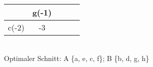 \documentclass[a4paper]{article}
\begin{document}
	\begin{minipage}[t]{.48\textwidth}
		\begin{center}
			\begin{tabular}{c|cccc}
							&	g(-1)	\\\hline
					c(-2)	&	-3
			\end{tabular}	
		\end{center}
	\end{minipage}\\
	Optimaler Schnitt: A \{a, e, c, f\}; B \{b, d, g, h\}
\end{document}

